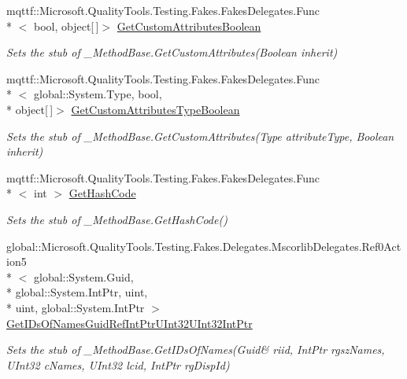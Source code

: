 \begin{DoxyCompactItemize}
mqttf\-::\-Microsoft.\-Quality\-Tools.\-Testing.\-Fakes.\-Fakes\-Delegates.\-Func\\*
$<$ bool, object\mbox{[}$\,$\mbox{]}$>$ \hyperlink{class_system_1_1_runtime_1_1_interop_services_1_1_fakes_1_1_stub___method_base_a5befae14d579edd1c5795a6293eec1ec}{Get\-Custom\-Attributes\-Boolean}
\begin{DoxyCompactList}\small\item\em Sets the stub of \-\_\-\-Method\-Base.\-Get\-Custom\-Attributes(\-Boolean inherit)\end{DoxyCompactList}\item 
mqttf\-::\-Microsoft.\-Quality\-Tools.\-Testing.\-Fakes.\-Fakes\-Delegates.\-Func\\*
$<$ global\-::\-System.\-Type, bool, \\*
object\mbox{[}$\,$\mbox{]}$>$ \hyperlink{class_system_1_1_runtime_1_1_interop_services_1_1_fakes_1_1_stub___method_base_ac3e7f81c1dd5587feb3a7d2f56bfe802}{Get\-Custom\-Attributes\-Type\-Boolean}
\begin{DoxyCompactList}\small\item\em Sets the stub of \-\_\-\-Method\-Base.\-Get\-Custom\-Attributes(\-Type attribute\-Type, Boolean inherit)\end{DoxyCompactList}\item 
mqttf\-::\-Microsoft.\-Quality\-Tools.\-Testing.\-Fakes.\-Fakes\-Delegates.\-Func\\*
$<$ int $>$ \hyperlink{class_system_1_1_runtime_1_1_interop_services_1_1_fakes_1_1_stub___method_base_ac5cd8ece722cfd0e06a0b8976003de00}{Get\-Hash\-Code}
\begin{DoxyCompactList}\small\item\em Sets the stub of \-\_\-\-Method\-Base.\-Get\-Hash\-Code()\end{DoxyCompactList}\item 
global\-::\-Microsoft.\-Quality\-Tools.\-Testing.\-Fakes.\-Delegates.\-Mscorlib\-Delegates.\-Ref0\-Action5\\*
$<$ global\-::\-System.\-Guid, \\*
global\-::\-System.\-Int\-Ptr, uint, \\*
uint, global\-::\-System.\-Int\-Ptr $>$ \hyperlink{class_system_1_1_runtime_1_1_interop_services_1_1_fakes_1_1_stub___method_base_a24a811882fcc620ee3a5d80b4802eadd}{Get\-I\-Ds\-Of\-Names\-Guid\-Ref\-Int\-Ptr\-U\-Int32\-U\-Int32\-Int\-Ptr}
\begin{DoxyCompactList}\small\item\em Sets the stub of \-\_\-\-Method\-Base.\-Get\-I\-Ds\-Of\-Names(Guid\& riid, Int\-Ptr rgsz\-Names, U\-Int32 c\-Names, U\-Int32 lcid, Int\-Ptr rg\-Disp\-Id)\end{DoxyCompactList}\item 

\end{DoxyCompactItemize}
